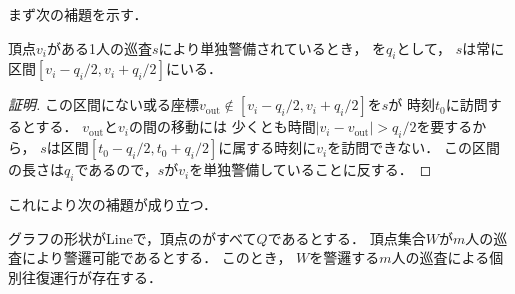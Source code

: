 まず次の補題を示す．

\begin{lemm}
    \label{lemm:RangeOfPatrollerOnLine}
    頂点$v_i$がある1人の巡査$s$により単独警備されているとき，
    {\timelimit}を$q_i$として，
    $s$は常に区間$[v_i - q_i/2, v_i + q_i/2]$にいる．
\end{lemm}

\begin{proof}[証明]
    \newcommand{\vout}{v_{\mathrm{out}}}
    この区間にない或る座標$\vout \notin [v_i - q_i/2, v_i + q_i/2]$を$s$が
    時刻$t_0$に訪問するとする．
    $\vout$と$v_i$の間の移動には
    少くとも時間$\lvert v_i - \vout \rvert > q _i / 2$を要するから，
    $s$は区間$[t_0 - q _i / 2, t_0 + q _i / 2]$に属する時刻に$v_i$を訪問できない．
    この区間の長さは$
        q_i
    $であるので，$s$が$v _i$を単独警備していることに反する．
\end{proof}



これにより次の補題が成り立つ．


\begin{lemm}
 \label{lemm:LineEqualTimelimitIndependentInterval}
    グラフの形状がLineで，頂点の{\timelimit}がすべて$Q$であるとする．
    頂点集合$W$が$m$人の巡査により警邏可能であるとする．
    このとき，
    $W$を警邏する$m$人の巡査による個別往復運行が存在する．
\end{lemm}


